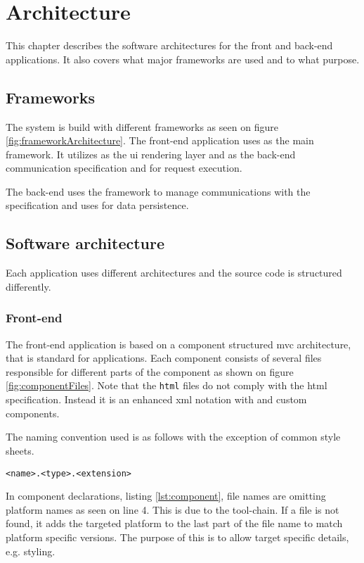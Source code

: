 \chapter{Architecture}
This chapter describes the software architectures for the front and back-end applications.
It also covers what major frameworks are used and to what purpose.

\section{Frameworks}
The system is build with different frameworks as seen on figure  \ref{fig:frameworkArchitecture}.
The front-end application uses  as the main framework.
It utilizes  as the \gls{ui} rendering layer and  as the back-end communication specification and  for request execution.

The back-end uses the  framework to manage communications with the  specification and uses  for data persistence.


\section{Software architecture}
Each application uses different architectures and the source code is structured differently.

\subsection{Front-end}
The front-end application is based on a component structured \gls{mvc} architecture, that is standard for  applications.
Each component consists of several files responsible for different parts of the component as shown on figure \ref{fig:componentFiles}.
Note that the \verb+html+ files do not comply with the \gls{html} specification.
Instead it is an enhanced \gls{xml} notation with  and custom components.


The naming convention used is as follows with the exception of common style sheets.

\verb+<name>.<type>.<extension>+

In  component declarations, listing \ref{lst:component}, file names are omitting platform names as seen on line 4.
This is due to the  tool-chain.
If a file is not found, it adds the targeted platform to the last part of the file name to match platform specific versions.
The purpose of this is to allow target specific details, e.g. styling.

